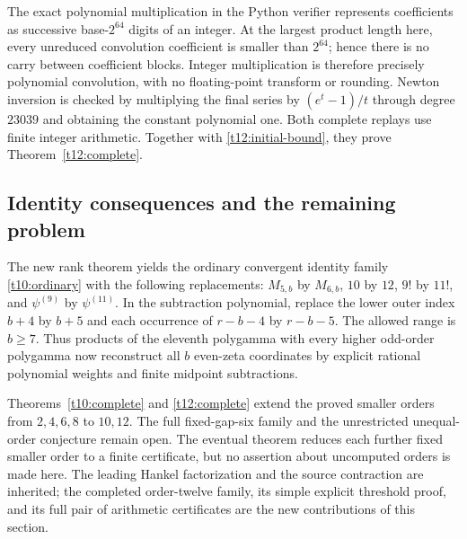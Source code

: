 The exact polynomial multiplication in the Python verifier represents
coefficients as successive base-$2^{64}$ digits of an integer. At the
largest product length here, every unreduced convolution coefficient
is smaller than $2^{64}$; hence there is no carry between coefficient
blocks. Integer multiplication is therefore precisely polynomial
convolution, with no floating-point transform or rounding. Newton
inversion is checked by multiplying the final series by
$(e^t-1)/t$ through degree $23039$ and obtaining the constant polynomial
one. Both complete replays use finite integer arithmetic. Together
with \eqref{t12:initial-bound}, they prove
Theorem~\ref{t12:complete}.

\subsection{Identity consequences and the remaining problem}

The new rank theorem yields the ordinary convergent identity family
\eqref{t10:ordinary} with the following replacements:
$M_{5,b}$ by $M_{6,b}$, $10$ by $12$, $9!$ by $11!$, and
$\psi^{(9)}$ by $\psi^{(11)}$. In the subtraction polynomial,
replace the lower outer index $b+4$ by $b+5$ and each occurrence of
$r-b-4$ by $r-b-5$. The allowed range is $b\ge7$. Thus products
of the eleventh polygamma with every higher odd-order polygamma
now reconstruct all $b$ even-zeta coordinates by explicit rational
polynomial weights and finite midpoint subtractions.

Theorems~\ref{t10:complete} and \ref{t12:complete} extend the proved
smaller orders from $2,4,6,8$ to $10,12$. The full fixed-gap-six
family and the unrestricted unequal-order conjecture remain open.
The eventual theorem reduces each further fixed smaller order to a
finite certificate, but no assertion about uncomputed orders is made
here. The leading Hankel factorization and the source contraction
are inherited; the completed order-twelve family, its simple explicit
threshold proof, and its full pair of arithmetic certificates are the
new contributions of this section.
